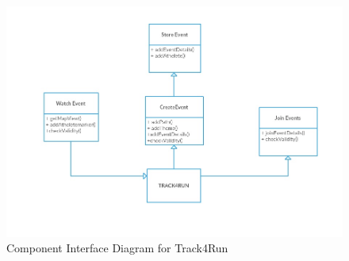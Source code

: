 \begin{figure}[H]
	\begin{center}
		\includegraphics[width=\textwidth]{./DD_Diagrams/InterfaceTrack4Run.jpg}
      \caption{Component Interface Diagram for Track4Run}
        \label{TrackMe_int3}
	\end{center}
\end{figure}